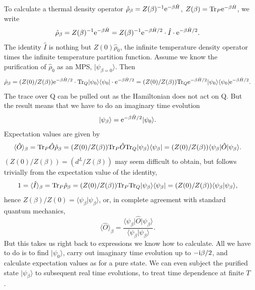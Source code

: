 \documentclass[a4paper,10pt,oneside,onecolumn,1p,times]{elsarticle}
\newcommand{\tr}{{\rm Tr }}
\newcommand{\eul}{{\rm e }}
\newcommand{\imag}{{\rm i }}
\newcommand{\bra}[1]{\mbox{$\langle #1  |$}}
\newcommand{\ket}[1]{\mbox{$| #1  \rangle$}}
\newcommand{\braket}[2]{\mbox{$\langle #1  | #2 \rangle$}} 	%
\begin{document}
To calculate a thermal density operator $\hat{\rho}_\beta= Z(\beta)^{-1} \eul^{-\beta \hat{H}}$, $Z(\beta) = \tr_P \eul^{-\beta \hat{H}}$, we write
\begin{equation}
\hat{\rho}_\beta = Z(\beta)^{-1} \eul^{-\beta \hat{H}} = Z(\beta)^{-1} \eul^{-\beta \hat{H}/2} \cdot \hat{I} \cdot \eul^{-\beta \hat{H}/2} .
\end{equation}
The identity $\hat{I}$ is nothing but $Z(0) \hat{\rho}_0$, the infinite temperature density operator times the infinite temperature partition function. Assume we know the purification of $\hat{\rho}_0$ as an MPS, $\ket{\psi_{\beta=0}}$. Then
\begin{equation}
\hat{\rho}_\beta = (Z(0)/Z(\beta)) \eul^{-\beta \hat{H}/2} \cdot \tr_Q \ket{\psi_0}\bra{\psi_0} \cdot \eul^{-\beta \hat{H}/2} = (Z(0)/Z(\beta)) \tr_Q \eul^{-\beta \hat{H}/2}\ket{\psi_0} \bra{\psi_0}\eul^{-\beta \hat{H}/2} .
\end{equation}
The trace over Q can be pulled out as the Hamiltonian does not act on Q. But the result means that we have to do an imaginary time evolution
\begin{equation}
\ket{\psi_\beta} = \eul^{-\beta \hat{H}/2}\ket{\psi_0} .
\end{equation}
Expectation values are given by 
\begin{equation}
\langle \hat{O} \rangle_\beta = \tr_P \hat{O}\hat{\rho}_\beta =
(Z(0)/Z(\beta)) \tr_P \hat{O} \tr_Q \ket{\psi_\beta} \bra{\psi_\beta}
= (Z(0)/Z(\beta)) \bra{\psi_\beta} \hat{O} \ket{\psi_\beta} .
\end{equation} 
$(Z(0)/Z(\beta)) = (d^L/Z(\beta))$ may seem difficult to obtain, but follows trivially from the expectation value of the identity, 
\begin{equation}
1 = \langle \hat{I} \rangle_\beta = \tr_P \hat{\rho}_\beta =
(Z(0)/Z(\beta)) \tr_P \tr_Q \ket{\psi_\beta} \bra{\psi_\beta}
= (Z(0)/Z(\beta)) \braket{\psi_\beta}{\psi_\beta} ,
\end{equation} 
hence $Z(\beta)/Z(0)= \braket{\psi_\beta}{\psi_\beta}$, or, in complete agreement with standard quantum mechanics,
\begin{equation}
\langle \hat{O} \rangle_\beta = \frac{ \bra{\psi_\beta} \hat{O}\ket{\psi_\beta}}{\braket{\psi_\beta}{\psi_\beta}} .
\end{equation}
But this takes us right back to expressions we know how to calculate. All we have to do is to find $\ket{\psi_0}$, carry out imaginary time evolution up to $-\imag\beta/2$, and calculate expectation values as for a pure state. We can even subject the purified state $\ket{\psi_\beta}$ to subsequent real time evolutions, to treat time dependence at finite $T$.
\end{document}
